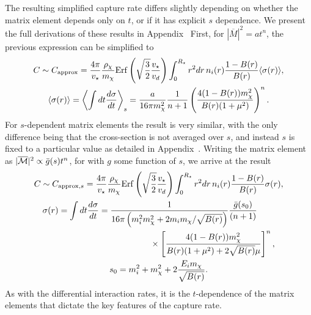 The resulting simplified capture rate differs slightly depending on whether the matrix element depends only on $t$, or if it has explicit $s$ dependence. We present the full derivations of these results in Appendix~
First, for $|\overline{M}|^2=a t^n$, the previous expression can be simplified to 
\begin{gather}
        C \sim C_\mathrm{approx} = \frac{4\pi}{v_\star} \frac{\rho_\chi}{m_\chi}{\rm Erf}\left(\sqrt{\frac{3}{2}}\frac{v_\star}{v_d}\right)\int_0^{R_\star}  r^2 dr \, n_i(r)  \frac{1-B(r)}{B(r)} \langle\sigma(r)\rangle 
\label{ch3:eq:csimplelargemtext}, \\
\langle\sigma(r)\rangle = \left\langle\int dt \frac{d\sigma}{dt} \right\rangle_s =   \frac{a}{16\pi m_\chi^2 } \frac{1}{n+1}\left(\frac{4(1-B(r))m_\chi^2}{B(r)(1+\mu^2)}\right)^{n}. 
\label{ch3:eq:xsecave}
\end{gather}
For $s$-dependent matrix elements the result is very similar, with the only difference being that the cross-section is not averaged over $s$, and instead $s$ is fixed to a particular value as detailed in Appendix~. Writing the matrix element as $|\overline{\mathcal M}|^2 \propto \bar{g}(s)t^n$, for with $g$ some function of $s$, we arrive at the result
\begin{gather}
    C \sim C_{\mathrm{approx}, s} = \frac{4\pi}{v_\star} \frac{\rho_\chi}{m_\chi}{\rm Erf}\left(\sqrt{\frac{3}{2}}\frac{v_\star}{v_d}\right)\int_0^{R_\star}  r^2 dr \, n_i(r)  \frac{1-B(r)}{B(r)} \sigma(r)
\label{ch3:eq:csimplelargemtext_sdep}, \\
\begin{split}
    \sigma(r) = \int dt \frac{d\sigma}{dt} & =   \frac{1}{16\pi \left(m_i^2 m_\chi^2 + 2m_i m_\chi/\sqrt{B(r)}\right)}\frac{\bar{g}(s_0)}{(n+1)}\\
    &\hspace{6em}\times\left[\frac{4(1 - B(r)) m_\chi^2}{B(r)(1 + \mu^2) + 2\sqrt{B(r)}\mu}\right]^n,
\label{ch3:eq:xsecave_sdep}
\end{split}\\
s_0 = m_i^2 + m_\chi^2 + 2\frac{E_im_\chi}{\sqrt{B(r)}}.
\end{gather}
As with the differential interaction rates, it is the $t$-dependence of the matrix elements that dictate the key features of the capture rate.


